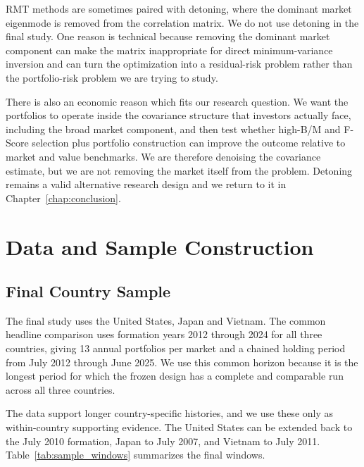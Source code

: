 \documentclass[11pt,a4paper]{report}
\numberwithin{figure}{chapter}
\numberwithin{table}{chapter}
\numberwithin{equation}{chapter}
\begin{document}
RMT methods are sometimes paired with detoning, where the dominant market eigenmode is removed from the correlation matrix. We do not use detoning in the final study. One reason is technical because removing the dominant market component can make the matrix inappropriate for direct minimum-variance inversion and can turn the optimization into a residual-risk problem rather than the portfolio-risk problem we are trying to study.

There is also an economic reason which fits our research question. We want the portfolios to operate inside the covariance structure that investors actually face, including the broad market component, and then test whether high-B/M and F-Score selection plus portfolio construction can improve the outcome relative to market and value benchmarks. We are therefore denoising the covariance estimate, but we are not removing the market itself from the problem. Detoning remains a valid alternative research design and we return to it in Chapter~\ref{chap:conclusion}.

\chapter{Data and Sample Construction}
\label{chap:data}

\section{Final Country Sample}

The final study uses the United States, Japan and Vietnam. The common headline comparison uses formation years 2012 through 2024 for all three countries, giving 13 annual portfolios per market and a chained holding period from July 2012 through June 2025. We use this common horizon because it is the longest period for which the frozen design has a complete and comparable run across all three countries.

The data support longer country-specific histories, and we use these only as within-country supporting evidence. The United States can be extended back to the July 2010 formation, Japan to July 2007, and Vietnam to July 2011. Table~\ref{tab:sample_windows} summarizes the final windows.
\end{document}
